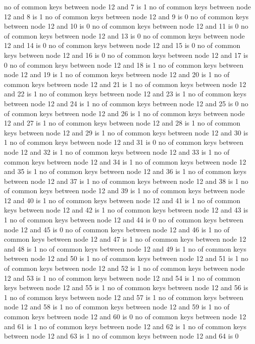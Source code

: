 no of common keys between node 12 and 7 is 1
no of common keys between node 12 and 8 is 1
no of common keys between node 12 and 9 is 0
no of common keys between node 12 and 10 is 0
no of common keys between node 12 and 11 is 0
no of common keys between node 12 and 13 is 0
no of common keys between node 12 and 14 is 0
no of common keys between node 12 and 15 is 0
no of common keys between node 12 and 16 is 0
no of common keys between node 12 and 17 is 0
no of common keys between node 12 and 18 is 1
no of common keys between node 12 and 19 is 1
no of common keys between node 12 and 20 is 1
no of common keys between node 12 and 21 is 1
no of common keys between node 12 and 22 is 1
no of common keys between node 12 and 23 is 1
no of common keys between node 12 and 24 is 1
no of common keys between node 12 and 25 is 0
no of common keys between node 12 and 26 is 1
no of common keys between node 12 and 27 is 1
no of common keys between node 12 and 28 is 1
no of common keys between node 12 and 29 is 1
no of common keys between node 12 and 30 is 1
no of common keys between node 12 and 31 is 0
no of common keys between node 12 and 32 is 1
no of common keys between node 12 and 33 is 1
no of common keys between node 12 and 34 is 1
no of common keys between node 12 and 35 is 1
no of common keys between node 12 and 36 is 1
no of common keys between node 12 and 37 is 1
no of common keys between node 12 and 38 is 1
no of common keys between node 12 and 39 is 1
no of common keys between node 12 and 40 is 1
no of common keys between node 12 and 41 is 1
no of common keys between node 12 and 42 is 1
no of common keys between node 12 and 43 is 1
no of common keys between node 12 and 44 is 0
no of common keys between node 12 and 45 is 0
no of common keys between node 12 and 46 is 1
no of common keys between node 12 and 47 is 1
no of common keys between node 12 and 48 is 1
no of common keys between node 12 and 49 is 1
no of common keys between node 12 and 50 is 1
no of common keys between node 12 and 51 is 1
no of common keys between node 12 and 52 is 1
no of common keys between node 12 and 53 is 1
no of common keys between node 12 and 54 is 1
no of common keys between node 12 and 55 is 1
no of common keys between node 12 and 56 is 1
no of common keys between node 12 and 57 is 1
no of common keys between node 12 and 58 is 1
no of common keys between node 12 and 59 is 1
no of common keys between node 12 and 60 is 0
no of common keys between node 12 and 61 is 1
no of common keys between node 12 and 62 is 1
no of common keys between node 12 and 63 is 1
no of common keys between node 12 and 64 is 0
